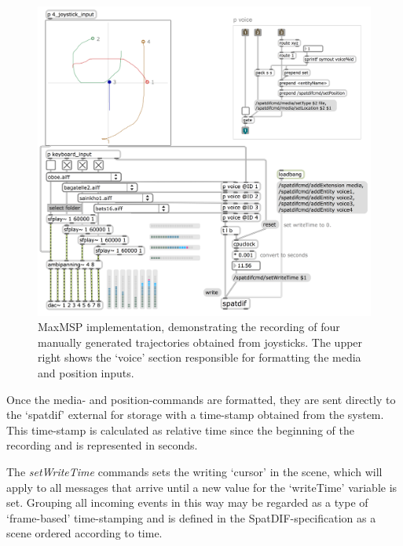 \documentclass{article}
\begin{document}
\begin{figure}[!ht]
	\centering
	\includegraphics[width=\columnwidth]{recording_maxpatch.png}
	\caption{MaxMSP implementation, demonstrating the recording of four manually generated trajectories obtained from joysticks. The upper right shows the `voice' section responsible for formatting the media and position inputs.} 
	\label{fig:screenshot2}
\end{figure}

Once the media- and position-commands are formatted, they are sent directly to the `spatdif' external for storage with a time-stamp obtained from the system.
This time-stamp is calculated as relative time since the beginning of the recording and is represented in seconds.

The \emph{setWriteTime} commands sets the writing `cursor' in the scene, which will apply to all messages that arrive until a new value for the `writeTime' variable is set.
Grouping all incoming events in this way may be regarded as a type of `frame-based' time-stamping and is defined in the SpatDIF-specification as a scene ordered according to time.
\end{document}
